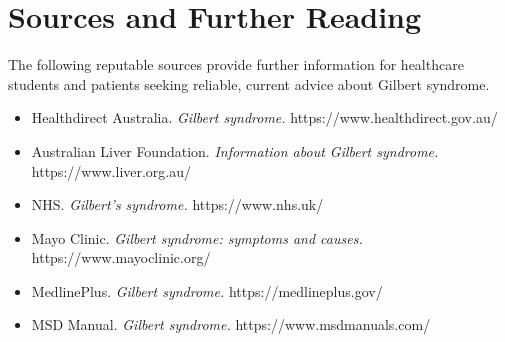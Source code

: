 \section*{Sources and Further Reading}
The following reputable sources provide further information for healthcare students and patients seeking reliable, current advice about Gilbert syndrome.

\begin{itemize}
    \item Healthdirect Australia. \textit{Gilbert syndrome.} https://www.healthdirect.gov.au/
    \item Australian Liver Foundation. \textit{Information about Gilbert syndrome.} https://www.liver.org.au/
    \item NHS. \textit{Gilbert's syndrome.} https://www.nhs.uk/
    \item Mayo Clinic. \textit{Gilbert syndrome: symptoms and causes.} https://www.mayoclinic.org/
    \item MedlinePlus. \textit{Gilbert syndrome.} https://medlineplus.gov/
    \item MSD Manual. \textit{Gilbert syndrome.} https://www.msdmanuals.com/
\end{itemize}
